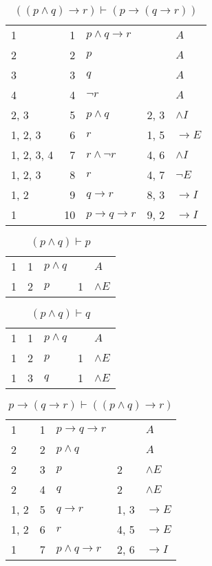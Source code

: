 \documentclass{article}
\begin{document}
\begin{table}[htbp]\caption*{$((p ∧ q) → r) ⊢ (p → (q → r))$}\centering\begin{tabular}{lrlll}
		{1} & 1 & $p∧q→r$ & {} & $A$ \\
		{2} & 2 & $p$ & {} & $A$ \\
		{3} & 3 & $q$ & {} & $A$ \\
		{4} & 4 & $¬r$ & {} & $A$ \\
		{2, 3} & 5 & $p∧q$ & {2, 3} & $∧I$ \\
		{1, 2, 3} & 6 & $r$ & {1, 5} & $→E$ \\
		{1, 2, 3, 4} & 7 & $r∧ ¬r$ & {4, 6} & $∧I$ \\
		{1, 2, 3} & 8 & $r$ & {4, 7} & $¬E$ \\
		{1, 2} & 9 & $q→r$ & {8, 3} & $→I$ \\
		{1} & 10 & $p→q→r$ & {9, 2} & $→I$ \\
	\end{tabular}
\end{table}
\begin{table}[htbp]\caption*{$(p ∧ q) ⊢ p$}\centering\begin{tabular}{lrlll}
		{1} & 1 & $p∧q$ & {} & $A$ \\
		{1} & 2 & $p$ & {1} & $∧E$ \\
	\end{tabular}
\end{table}
\begin{table}[htbp]\caption*{$(p ∧ q) ⊢ q$}\centering\begin{tabular}{lrlll}
		{1} & 1 & $p∧q$ & {} & $A$ \\
		{1} & 2 & $p$ & {1} & $∧E$ \\
		{1} & 3 & $q$ & {1} & $∧E$ \\
	\end{tabular}
\end{table}
\begin{table}[htbp]\caption*{$p → (q → r) ⊢ ((p ∧ q) → r)$}\centering\begin{tabular}{lrlll}
		{1} & 1 & $p→q→r$ & {} & $A$ \\
		{2} & 2 & $p∧q$ & {} & $A$ \\
		{2} & 3 & $p$ & {2} & $∧E$ \\
		{2} & 4 & $q$ & {2} & $∧E$ \\
		{1, 2} & 5 & $q→r$ & {1, 3} & $→E$ \\
		{1, 2} & 6 & $r$ & {4, 5} & $→E$ \\
		{1} & 7 & $p∧q→r$ & {2, 6} & $→I$ \\
	\end{tabular}
\end{table}
\end{document}
